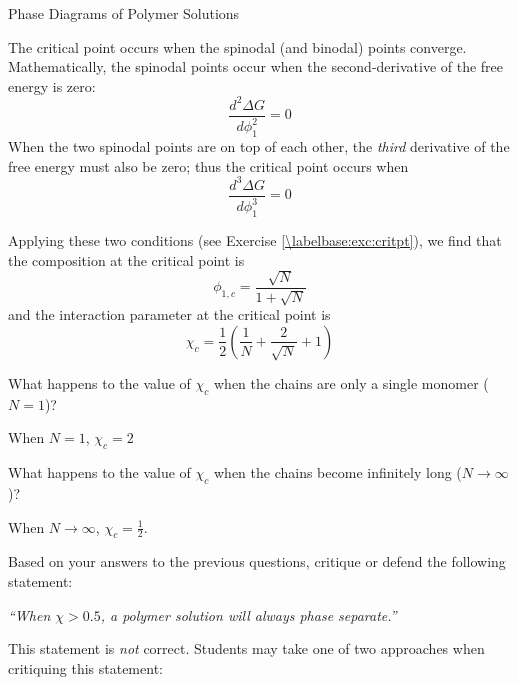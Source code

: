 \begin{activity}{Phase Diagrams of Polymer Solutions}
\begin{infobox}
	The critical point occurs when the spinodal (and binodal) points converge.  Mathematically, the spinodal points occur when the second-derivative of the free energy is zero:
	\begin{equation*}
		\frac{d^2\Delta G}{d\phi_1^2} = 0
	\end{equation*}
	When the two spinodal points are on top of each other, the \emph{third} derivative of the free energy must also be zero; thus the critical point occurs when 
	\begin{equation*}
		\frac{d^3\Delta G}{d\phi_1^3} = 0
	\end{equation*}
	
	Applying these two conditions (see Exercise \ref{\labelbase:exc:critpt}), we find that the composition at the critical point is
	\begin{equation*}
		\phi_{1,c} = \frac{\sqrt{N}}{1+\sqrt{N}}
		\label{\labelbase:eqn:phi1c}
	\end{equation*}
	and the interaction parameter at the critical point is
	\begin{equation*}
		\chi_c = \frac{1}{2}\left(\frac{1}{N} + \frac{2}{\sqrt{N}} + 1\right)
		\label{\labelbase:eqn:chic}
	\end{equation*}
	
\end{infobox}



\begin{ctqs}
	
	\question What happens to the value of $\chi_c$ when the chains are only a single monomer ($N=1$)?
	
		\begin{solution}[0.75in]
			When $N=1$, $\chi_c = 2$
		\end{solution}
	
	\question What happens to the value of $\chi_c$ when the chains become infinitely long ($N\to\infty$)?	
	
		\begin{solution}[0.75in]
			When $N\to\infty$, $\chi_c = \frac{1}{2}$.
		\end{solution}
	
	\question Based on your answers to the previous questions, critique or defend the following statement:
	
		\emph{``When $\chi > 0.5$, a polymer solution will always phase separate.'' }
	
		\begin{solution}[2.5in]
			This statement is \emph{not} correct.  Students may take one of two approaches when critiquing this statement:
			

\end{solution}
\end{ctqs}
\end{activity}

